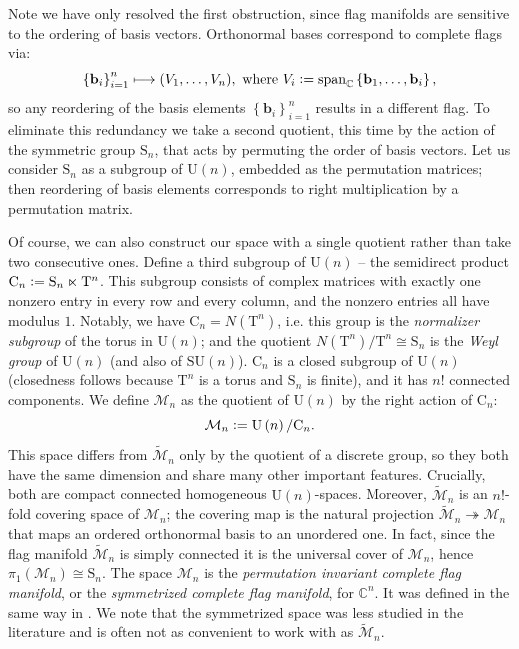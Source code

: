 \documentclass[referee,sn-mathphys-num]{sn-jnl}%
\theoremstyle{thmstyleone}%
\theoremstyle{thmstyletwo}%
\theoremstyle{remark}
\theoremstyle{thmstylethree}%
\newcommand{\defeq}{\vcentcolon=}
\begin{document}
Note we have only resolved the first obstruction, since flag manifolds are sensitive to the ordering of basis vectors. Orthonormal bases correspond to complete flags via:
\begin{equation}
	\left\{ \mathbf{b}_i \right\}_{i=1}^n\longmapsto (V_1,\dots,V_n)
	, \text{ where } V_i \defeq \mathrm{span}_{\mathbb{C}} \left\{ \mathbf{b}_1, \ldots, \mathbf{b}_i \right\} ,
\end{equation}
so any reordering of the basis elements $ \left\{ \mathbf{b}_i \right\}_{i=1}^n $ results in a different flag.
To eliminate this redundancy we take a second quotient, this time by the action of the symmetric group $ \mathrm{S}_n $, that acts by permuting the order of basis vectors. Let us consider $ \mathrm{S}_n $ as a subgroup of $ \mathrm{U} \left( n \right) $, embedded as the permutation matrices; then reordering of basis elements corresponds to right multiplication by a permutation matrix.

Of course, we can also construct our space with a single quotient rather than take two consecutive ones. 
Define a third subgroup of $ \mathrm{U} \left( n \right) $ -- the semidirect product $ \mathrm{C}_n \defeq \mathrm{S}_n \ltimes \mathrm{T}^n $. This subgroup consists of complex matrices with exactly one nonzero entry in every row and every column, and the nonzero entries all have modulus $1$. Notably, we have $ \mathrm{C}_n = N \left( \mathrm{T}^n \right) $, i.e. this group is the \textit{normalizer subgroup} of the torus in $ \mathrm{U} \left( n \right) $; and the quotient $ N \left( \mathrm{T}^n \right) / \mathrm{T}^n \cong \mathrm{S}_n $ is the \textit{Weyl group} of $ \mathrm{U} \left( n \right) $ (and also of $ \mathrm{SU} \left( n \right) $).
$\mathrm{C}_n$ is a closed subgroup of $ \mathrm{U} \left( n \right) $ (closedness follows because $\mathrm{T}^n$ is a torus and $\mathrm{S}_n$ is finite), and it has $n!$ connected components.
We define $\mathcal{M}_n$ as the quotient of $ \mathrm{U} \left( n \right) $ by the right action of $\mathrm{C}_n$:
\begin{equation}
	\mathcal{M}_n \defeq \mathrm{U} \left( n \right) / \mathrm{C}_n .
\end{equation}
This space differs from $ \tilde{\mathcal{M}}_n $ only by the quotient of a discrete group, so they both have the same dimension and share many other important features. Crucially, both are compact connected homogeneous $ \mathrm{U} \left( n \right) $-spaces. Moreover, $ \tilde{\mathcal{M}}_n $ is an $n!$-fold covering space of $ \mathcal{M}_n $; the covering map is the natural projection $ \tilde{\mathcal{M}}_n \twoheadrightarrow \mathcal{M}_n $ that maps an ordered orthonormal basis to an unordered one. In fact, since the flag manifold $ \tilde{\mathcal{M}}_n $ is simply connected it is the universal cover of $ \mathcal{M}_n $, hence $ \pi_1 \left( \mathcal{M}_n \right) \cong \mathrm{S}_n $.
The space $ \mathcal{M}_n $ is the \textit{permutation invariant complete flag manifold}, or the \textit{symmetrized complete flag manifold}, for $ \mathbb{C}^n $. It was defined in the same way in \cite{tirkkonen2017grassmannian}.
We note that the symmetrized space was less studied in the literature and is often not as convenient to work with as $ \tilde{\mathcal{M}}_n $.
\end{document}
